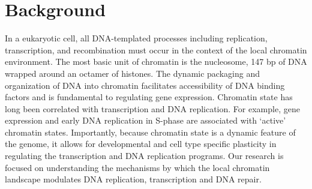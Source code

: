 \section{Background}
In a eukaryotic cell, all DNA-templated processes including replication, transcription, and recombination must occur in the context of the local chromatin environment.  The most basic unit of chromatin is the nucleosome, 147 bp of DNA wrapped around an octamer of histones\citep{McGinty2015-kd}.  The dynamic packaging and organization of DNA into chromatin facilitates accessibility of DNA binding factors and is fundamental to regulating gene expression\citep{Kouzarides2007-sk}. Chromatin state has long been correlated with transcription and DNA replication\citep{Stambrook1970-jm,Goldman1984-im}.  For example, gene expression and early DNA replication in S-phase are associated with `active' chromatin states\citep{Rhind2013-yr}. Importantly, because chromatin state is a dynamic feature of the genome, it allows for developmental and cell type specific plasticity in regulating the transcription and DNA replication programs\citep{Goren2008-wr}.  Our research is focused on understanding the mechanisms by which the local chromatin landscape modulates DNA replication, transcription and DNA repair.

